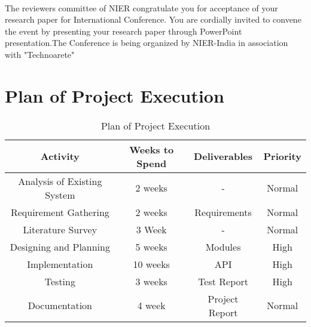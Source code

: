 \documentclass[oneside,a4paper,12pt]{article}
\begin{document}
\paragraph{}
The reviewers committee of NIER congratulate  you for acceptance of your research paper for International Conference. You are cordially invited to convene the event by presenting your research paper through PowerPoint presentation.The Conference is being organized by NIER-India in association with "Technoarete"

\section{Plan of Project Execution}
\begin{table}[!htbp]
\begin{center}
\def\arraystretch{1.5}
  \begin{tabular}{| c | c | c | c |}
       \hline

	\textbf{Activity} & \textbf{Weeks to Spend} & \textbf{Deliverables} & \textbf{Priority}\\ \hline
	Analysis of Existing System & 2 weeks & - & Normal \\ \hline
	Requirement Gathering & 2 weeks & Requirements & Normal \\ \hline 
	Literature Survey & 3 Week & - & Normal \\ \hline
	Designing and Planning & 5 weeks & Modules & High \\ \hline
	Implementation & 10 weeks & API & High \\ \hline
	Testing & 3 weeks & Test Report & High \\ \hline
	Documentation & 4 week & Project Report & Normal \\ \hline
\end{tabular}
 \caption { Plan of Project Execution }
 \label{tab:hreq}
\end{center}

\end{table}
\end{document}
